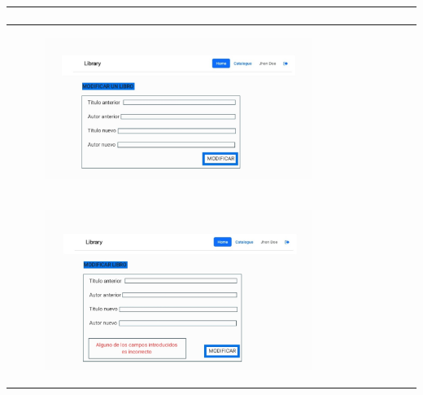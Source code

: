 \documentclass{report}
\begin{document}
\begin{center}
\begin{longtable}{|p{\linewidth}|}
\begin{figure}[H]
                            \end{figure}\\
                            \hline
                            \begin{figure}[H]
                                \centering
                                \includegraphics[width=0.8\textwidth]{./img/grafico/ModificarLibro.jpg}
                            \end{figure}\\
                            \hline
                            \begin{figure}[H]
                                \centering
                                \includegraphics[width=0.8\textwidth]{./img/grafico/ErrorModificarLibro.jpg}
                            \end{figure}\\
                            \hline
                    \end{longtable}
                \end{center}
                \clearpage
\end{document}
